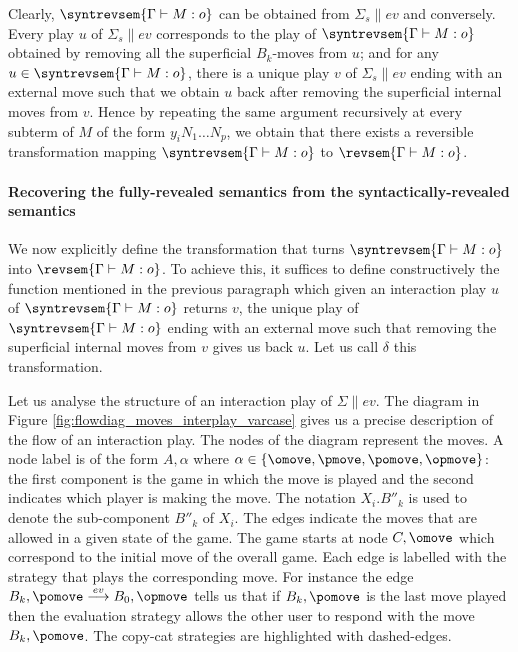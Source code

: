     Clearly, $\syntrevsem{\Gamma \vdash M : o}$ can be obtained from $\Sigma_s \| ev$ and conversely. Every play $u$ of $\Sigma_s \| ev$ corresponds to the play of $\syntrevsem{\Gamma \vdash M : o}$ obtained by removing all the superficial $B_k$-moves from $u$; and for any $u \in \syntrevsem{\Gamma \vdash M : o}$, there is a unique play $v$ of $\Sigma_s \| ev$ ending with an external move such that we obtain $u$ back after removing the superficial internal moves from $v$.
    Hence by repeating the same argument recursively at every subterm of $M$ of the form $y_i N_1 \ldots N_p$, we obtain that
    there exists a reversible transformation mapping $\syntrevsem{\Gamma \vdash M : o}$ to $\revsem{\Gamma \vdash M : o}$.

    \paragraph{Recovering the fully-revealed semantics from the syntactically-revealed semantics}


    We now explicitly define the transformation that turns $\syntrevsem{\Gamma \vdash M : o}$ into $\revsem{\Gamma \vdash M : o}$. To achieve this, it suffices to define constructively the function mentioned in the previous paragraph which given an interaction play $u$ of $\syntrevsem{\Gamma \vdash M : o}$ returns $v$, the unique play of $\syntrevsem{\Gamma \vdash M : o}$ ending with an external move such that removing the superficial internal moves from $v$ gives us back $u$. Let us call $\delta$ this transformation.

    Let us analyse the structure of an interaction play of $\Sigma \|  ev$. The diagram in Figure \ref{fig:flowdiag_moves_interplay_varcase} gives us a precise description of the flow of an interaction play. The nodes of the diagram represent the moves. A node label is of the form $A,\alpha$ where $\alpha \in \{\omove,\pmove,\pomove,\opmove\}$: the first component is the game in which the move is played and the second indicates which player is making the move. The notation $X_i.B''_k$ is used to denote the sub-component $B''_k$ of $X_i$. The edges indicate the moves that are allowed in a given state of the game. The game starts at node $C,\omove$ which correspond to the initial move of the overall game. Each edge is labelled with the strategy that plays the corresponding move. For instance the edge $B_k,\pomove \stackrel{ev}\longrightarrow B_0,\opmove$ tells us that if $B_k,\pomove$ is the last move played then the evaluation strategy allows the other user to respond with the move $B_k,\pomove$. The copy-cat strategies are highlighted with dashed-edges.

